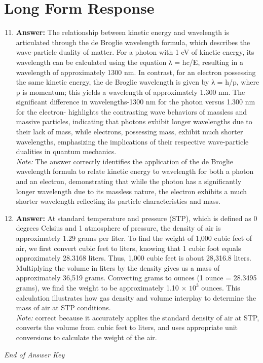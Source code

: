 \documentclass[12pt]{article}
\begin{document}
\section*{Long Form Response}
\begin{enumerate}[label=\arabic*.]
\setcounter{enumi}{10}
\item \textbf{Answer:} The relationship between kinetic energy and wavelength is articulated through the de Broglie wavelength formula, which describes the wave-particle duality of matter. For a photon with 1 eV of kinetic energy, its wavelength can be calculated using the equation λ = hc/E, resulting in a wavelength of approximately 1300 nm. In contrast, for an electron possessing the same kinetic energy, the de Broglie wavelength is given by λ = h/p, where p is momentum; this yields a wavelength of approximately 1.300 nm. The significant difference in wavelengths-1300 nm for the photon versus 1.300 nm for the electron- highlights the contrasting wave behaviors of massless and massive particles, indicating that photons exhibit longer wavelengths due to their lack of mass, while electrons, possessing mass, exhibit much shorter wavelengths, emphasizing the implications of their respective wave-particle dualities in quantum mechanics.
\\ \textit{Note:} The answer correctly identifies the application of the de Broglie wavelength formula to relate kinetic energy to wavelength for both a photon and an electron, demonstrating that while the photon has a significantly longer wavelength due to its massless nature, the electron exhibits a much shorter wavelength reflecting its particle characteristics and mass.
\item \textbf{Answer:} At standard temperature and pressure (STP), which is defined as 0 degrees Celsius and 1 atmosphere of pressure, the density of air is approximately 1.29 grams per liter. To find the weight of 1,000 cubic feet of air, we first convert cubic feet to liters, knowing that 1 cubic foot equals approximately 28.3168 liters. Thus, 1,000 cubic feet is about 28,316.8 liters. Multiplying the volume in liters by the density gives us a mass of approximately 36,519 grams. Converting grams to ounces (1 ounce = 28.3495 grams), we find the weight to be approximately 1.10 \ensuremath{\times} $10^3$ ounces. This calculation illustrates how gas density and volume interplay to determine the mass of air at STP conditions.
\\ \textit{Note:} correct because it accurately applies the standard density of air at STP, converts the volume from cubic feet to liters, and uses appropriate unit conversions to calculate the weight of the air.
\end{enumerate}

\vfill
\noindent\textit{End of Answer Key}
\end{document}

